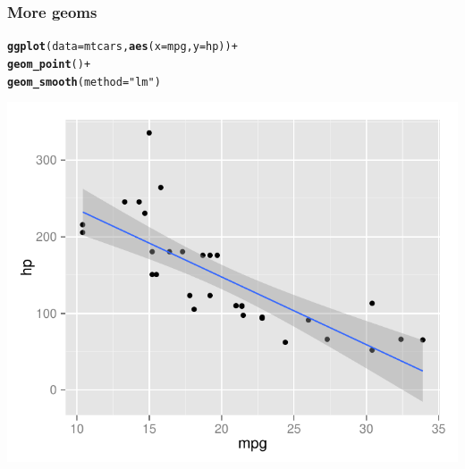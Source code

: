 \documentclass[12pt]{beamer}\usepackage[]{graphicx}\usepackage[]{color}
\makeatletter
\newcommand{\hlstr}[1]{\textcolor[rgb]{0.192,0.494,0.8}{#1}}%
\newcommand{\hlopt}[1]{\textcolor[rgb]{0,0,0}{#1}}%
\newcommand{\hlstd}[1]{\textcolor[rgb]{0.345,0.345,0.345}{#1}}%
\newcommand{\hlkwc}[1]{\textcolor[rgb]{0.333,0.667,0.333}{#1}}%
\newcommand{\hlkwd}[1]{\textcolor[rgb]{0.737,0.353,0.396}{\textbf{#1}}}%
\newenvironment{kframe}{%
 \def\at@end@of@kframe{}%
 \ifinner\ifhmode%
  \def\at@end@of@kframe{\end{minipage}}%
  \begin{minipage}{\columnwidth}%
 \fi\fi%
 \def\FrameCommand##1{\hskip\@totalleftmargin \hskip-\fboxsep
 \colorbox{shadecolor}{##1}\hskip-\fboxsep
     \hskip-\linewidth \hskip-\@totalleftmargin \hskip\columnwidth}%
 \MakeFramed {\advance\hsize-\width
   \@totalleftmargin\z@ \linewidth\hsize
   \@setminipage}}%
 {\par\unskip\endMakeFramed%
 \at@end@of@kframe}
\newenvironment{knitrout}{}{} %
\makeatother
\begin{document}

\begin{frame}[fragile]
\frametitle{More geoms}
\begin{knitrout}\scriptsize
{}\color{fgcolor}\begin{kframe}
\begin{alltt}
\hlkwd{ggplot}\hlstd{(}\hlkwc{data} \hlstd{= mtcars,} \hlkwd{aes}\hlstd{(}\hlkwc{x} \hlstd{= mpg,} \hlkwc{y} \hlstd{= hp))} \hlopt{+}
  \hlkwd{geom_point}\hlstd{()} \hlopt{+}
  \hlkwd{geom_smooth}\hlstd{(}\hlkwc{method} \hlstd{=} \hlstr{"lm"}\hlstd{)}
\end{alltt}
\end{kframe}

{\centering \includegraphics[width=.7\linewidth,height=.6\linewidth]{figure/xyplot_mtcars10-1} 

}



\end{knitrout}

\end{frame}

\end{document}
